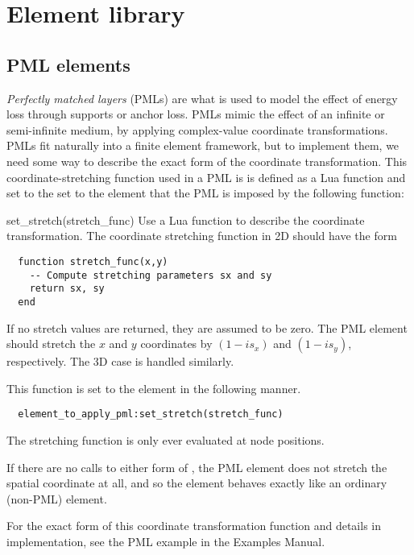 \newpage
\section{Element library}
\label{section:ElementLibrary}
\subsection{PML elements}

\emph{Perfectly matched layers} (PMLs) are what is used to model
the effect of energy loss through supports or anchor loss.
PMLs mimic the effect of an infinite or semi-infinite medium,
by applying complex-value coordinate transformations.
PMLs fit naturally
into a finite element framework, but to implement them, we need some
way to describe the exact form of the coordinate transformation.
This coordinate-stretching function used in a PML is is defined as a
Lua function and set to the set to the element that
the PML is imposed by the following function:
\begin{codelist}

  \item[set\_stretch(stretch\_func)]
    Use a Lua function  to describe the coordinate 
    transformation.  
    The coordinate stretching function in 2D should have the form
    \begin{verbatim}
  function stretch_func(x,y)
    -- Compute stretching parameters sx and sy
    return sx, sy
  end
    \end{verbatim}
    If no stretch values are returned, they are assumed to be zero.
    The PML element should stretch the $x$ and $y$ coordinates by
    $(1-is_x)$ and $(1-is_y)$, respectively.  The 3D case is handled
    similarly.

    This function is set to the element in the following manner.
    \begin{verbatim}
  element_to_apply_pml:set_stretch(stretch_func)
    \end{verbatim}

    The stretching function is only ever evaluated at node positions.

\end{codelist}
If there are no calls to either form of , the PML
element does not stretch the spatial coordinate at all, and so the
element behaves exactly like an ordinary (non-PML) element.

For the exact form of this coordinate transformation function and
details in implementation, see the PML example in the Examples
Manual.

